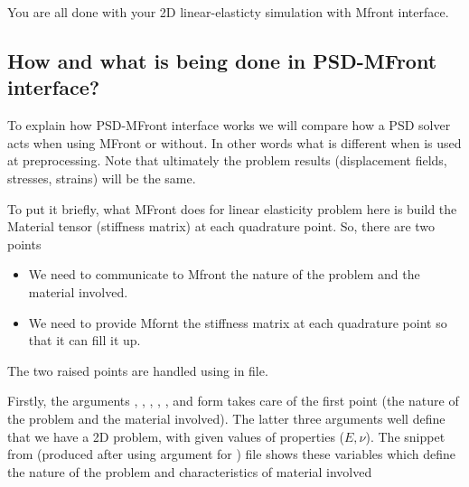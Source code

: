 You are all done with your 2D linear-elasticty simulation with Mfront
interface.

\subsection{How and what is being done in PSD-MFront interface? }

To explain how PSD-MFront interface works we will compare how a PSD
solver acts when using MFront or without. In other words what is
different when  is used at preprocessing. Note that
ultimately the problem results (displacement fields, stresses, strains)
will be the same.

To put it briefly, what MFront does for linear elasticity problem here
is build the Material tensor (stiffness matrix) at each quadrature
point. So, there are two points

\begin{itemize}
\item We need to communicate to Mfront the nature of the problem and the material involved.
\item We need to provide Mfornt the stiffness matrix at each quadrature point so that it can fill it up.
\end{itemize}

The two raised points are handled using
 in  file.

Firstly, the arguments , ,
,
,
,
 and
 form
 takes care of the first point (the nature of
the problem and the material involved). The latter three arguments well
define that we have a 2D problem, with given values of properties
(\(E, \nu\)). The snippet from  (produced
after using  argument for ) file
shows these variables which define the nature of the problem and
characteristics of material involved

